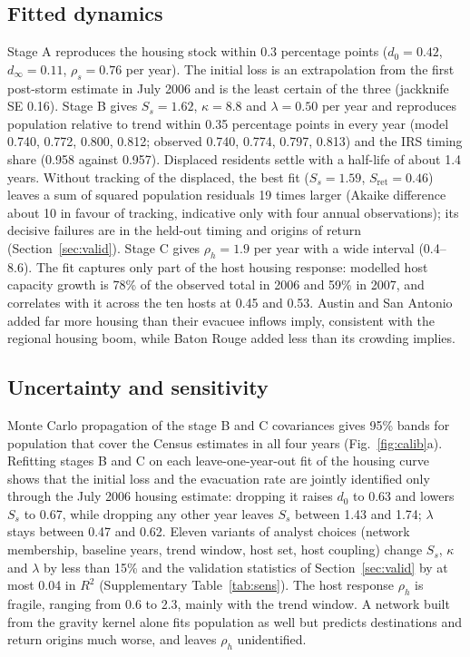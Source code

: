 \documentclass[11pt]{article}
\begin{document}
\subsection{Fitted dynamics}
Stage A reproduces the housing stock within 0.3 percentage points ($d_0=0.42$, $d_\infty=0.11$, $\rho_s=0.76$ per year). The initial loss is an extrapolation from the first post-storm estimate in July 2006 and is the least certain of the three (jackknife SE 0.16). Stage B gives $S_s=1.62$, $\kappa=8.8$ and $\lambda=0.50$ per year and reproduces population relative to trend within 0.35 percentage points in every year (model 0.740, 0.772, 0.800, 0.812; observed 0.740, 0.774, 0.797, 0.813) and the IRS timing share (0.958 against 0.957). Displaced residents settle with a half-life of about 1.4 years. Without tracking of the displaced, the best fit ($S_s=1.59$, $S_{\text{ret}}=0.46$) leaves a sum of squared population residuals 19 times larger (Akaike difference about 10 in favour of tracking, indicative only with four annual observations); its decisive failures are in the held-out timing and origins of return (Section~\ref{sec:valid}). Stage C gives $\rho_h=1.9$ per year with a wide interval (0.4--8.6). The fit captures only part of the host housing response: modelled host capacity growth is 78\% of the observed total in 2006 and 59\% in 2007, and correlates with it across the ten hosts at 0.45 and 0.53. Austin and San Antonio added far more housing than their evacuee inflows imply, consistent with the regional housing boom, while Baton Rouge added less than its crowding implies.

\subsection{Uncertainty and sensitivity}
Monte Carlo propagation of the stage B and C covariances gives 95\% bands for population that cover the Census estimates in all four years (Fig.~\ref{fig:calib}a). Refitting stages B and C on each leave-one-year-out fit of the housing curve shows that the initial loss and the evacuation rate are jointly identified only through the July 2006 housing estimate: dropping it raises $d_0$ to 0.63 and lowers $S_s$ to 0.67, while dropping any other year leaves $S_s$ between 1.43 and 1.74; $\lambda$ stays between 0.47 and 0.62. Eleven variants of analyst choices (network membership, baseline years, trend window, host set, host coupling) change $S_s$, $\kappa$ and $\lambda$ by less than 15\% and the validation statistics of Section~\ref{sec:valid} by at most 0.04 in $R^2$ (Supplementary Table~\ref{tab:sens}). The host response $\rho_h$ is fragile, ranging from 0.6 to 2.3, mainly with the trend window. A network built from the gravity kernel alone fits population as well but predicts destinations and return origins much worse, and leaves $\rho_h$ unidentified.
\end{document}
